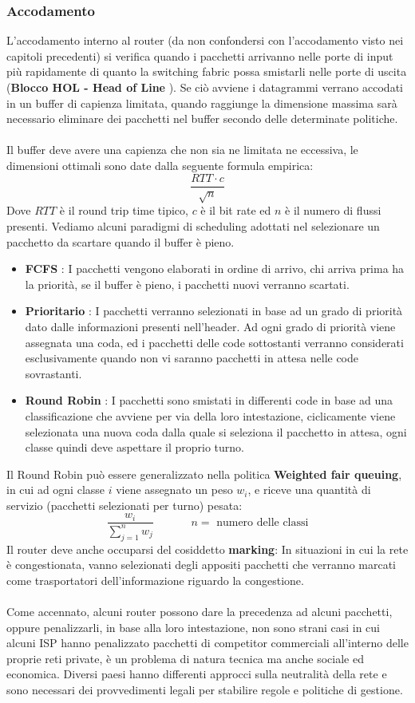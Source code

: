 \documentclass[12pt, letterpaper]{article}
\newcommand{\acc}{\\\hphantom{}\\}
\begin{document}
\subsubsection{Accodamento}
L'accodamento interno al router (da non confondersi con l'accodamento visto nei capitoli precedenti) si verifica quando 
i pacchetti arrivanno nelle porte di input più rapidamente di quanto la switching fabric possa smistarli nelle 
porte di uscita (\textbf{Blocco HOL - Head of Line }). Se ciò avviene i datagrammi verrano accodati in un buffer di capienza limitata, quando raggiunge la dimensione 
massima sarà necessario eliminare dei pacchetti nel buffer secondo delle determinate politiche.\acc 
Il buffer deve avere una capienza che non sia ne limitata ne eccessiva, le dimensioni ottimali sono date dalla 
seguente formula empirica: $$\dfrac{ RTT\cdot c}{\sqrt{n}}$$
Dove $RTT$ è il round trip time tipico, $c$ è il bit rate ed $n$ è il numero di flussi presenti. Vediamo alcuni paradigmi di 
scheduling adottati nel selezionare un pacchetto da scartare quando il buffer è pieno.\begin{itemize}
    \item \textbf{FCFS} : I pacchetti vengono elaborati in ordine di arrivo, chi arriva prima ha la priorità, se il buffer 
    è pieno, i pacchetti nuovi verranno scartati. 
    \item \textbf{Prioritario} : I pacchetti verranno selezionati in base ad un grado di priorità dato dalle informazioni 
    presenti nell'header. Ad ogni grado di priorità viene assegnata una coda, ed i pacchetti delle code sottostanti verranno 
    considerati esclusivamente quando non vi saranno pacchetti in attesa nelle code sovrastanti.
    \item \textbf{Round Robin} : I pacchetti sono smistati in differenti code in base ad una classificazione che avviene 
    per via della loro intestazione, ciclicamente viene selezionata una nuova coda dalla quale si seleziona il pacchetto in 
    attesa, ogni classe quindi deve aspettare il proprio turno.
\end{itemize} 
Il Round Robin può essere generalizzato nella politica \textbf{Weighted fair queuing}, in cui ad ogni classe $i$ viene 
assegnato un peso $w_i$, e riceve una quantità di servizio (pacchetti selezionati per turno) pesata: 
$$ \dfrac{w_i}{\sum_{j=1}^nw_j}\;\;\;\;\;\;\;\;\;\;\;\;n=\text{ numero delle classi}$$
Il router deve anche occuparsi del cosiddetto \textbf{marking}: In situazioni in cui la rete è congestionata, vanno 
selezionati degli appositi pacchetti che verranno marcati come trasportatori dell'informazione riguardo la congestione.\acc 
Come accennato, alcuni router possono dare la precedenza ad alcuni pacchetti, oppure penalizzarli, in base alla loro intestazione, 
non sono strani casi in cui alcuni ISP hanno penalizzato pacchetti di competitor commerciali all'interno delle proprie reti 
private, è un problema di natura tecnica ma anche sociale ed economica. Diversi paesi hanno differenti approcci sulla neutralità 
della rete e sono necessari dei provvedimenti legali per stabilire regole e politiche di gestione.
\end{document}
